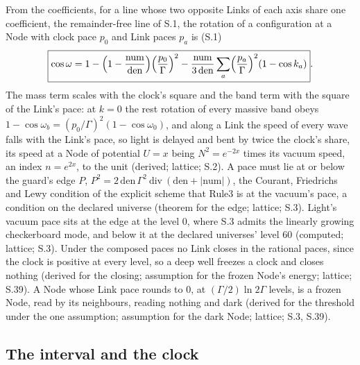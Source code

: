 \documentclass[pdflatex,sn-mathphys-num]{sn-jnl}
\newcommand{\num}{\mathrm{num}}
\newcommand{\den}{\mathrm{den}}
\newcommand{\ddiv}{\ \mathrm{div}\ }
\theoremstyle{thmstyleone}
\theoremstyle{thmstyletwo}
\begin{document}
From the coefficients, for a line whose two opposite Links of each axis share one coefficient, the remainder-free line of S.1, the rotation of a configuration at a Node with clock pace $p_0$ and Link paces $p_a$ is (S.1)
\begin{equation}\label{eq:bandpace}
\boxed{\cos\omega = 1 - \Bigl(1 - \frac{\num}{\den}\Bigr)\Bigl(\frac{p_0}{\Gamma}\Bigr)^2 - \frac{\num}{3\,\den}\sum_a \Bigl(\frac{p_a}{\Gamma}\Bigr)^2 (1 - \cos k_a)}.
\end{equation}
The mass term scales with the clock's square and the band term with the square of the Link's pace: at $k = 0$ the rest rotation of every massive band obeys $1 - \cos\omega_b = (p_0 / \Gamma)^2 (1 - \cos\omega_0)$, and along a Link the speed of every wave falls with the Link's pace, so light is delayed and bent by twice the clock's share, its speed at a Node of potential $U = x$ being $N^2 = e^{-2x}$ times its vacuum speed, an index $n = e^{2x}$, to the unit (derived; lattice; S.2). A pace must lie at or below the guard's edge $P$, $P^2 = 2\,\den\,\Gamma^2 \ddiv (\den + |\num|)$, the Courant, Friedrichs and Lewy condition \cite{cfl} of the explicit scheme that Rule3 is at the vacuum's pace, a condition on the declared universe (theorem for the edge; lattice; S.3). Light's vacuum pace sits at the edge at the level $0$, where S.3 admits the linearly growing checkerboard mode, and below it at the declared universes' level $60$ (computed; lattice; S.3). Under the composed paces no Link closes in the rational paces, since the clock is positive at every level, so a deep well freezes a clock and closes nothing (derived for the closing; assumption for the frozen Node's energy; lattice; S.39). A Node whose Link pace rounds to $0$, at $(\Gamma / 2)\ln 2\Gamma$ levels, is a frozen Node, read by its neighbours, reading nothing and dark (derived for the threshold under the one assumption; assumption for the dark Node; lattice; S.3, S.39).

\subsection{The interval and the clock}\label{sec:interval}
\end{document}
